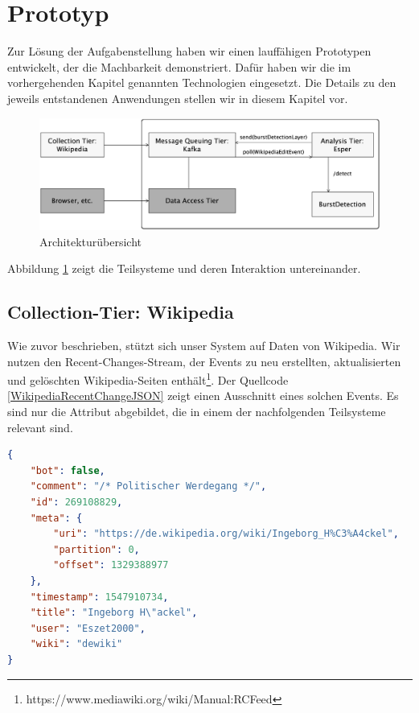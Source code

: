 \section{Prototyp}\label{section:prototyp}
Zur Lösung der Aufgabenstellung haben wir einen lauffähigen Prototypen entwickelt, der die Machbarkeit demonstriert.
Dafür haben wir die im vorhergehenden Kapitel genannten Technologien eingesetzt. Die Details zu den jeweils entstandenen
Anwendungen stellen wir in diesem Kapitel vor.

\begin{figure}
    \includegraphics[width=\textwidth]{images/Architektur_Uebersicht.png}
    \caption{Architekturübersicht}
    \label{fig:architektur_uebersicht}
\end{figure}

Abbildung \ref{fig:architektur_uebersicht} zeigt die Teilsysteme und deren Interaktion untereinander.


\subsection{Collection-Tier: Wikipedia}
Wie zuvor beschrieben, stützt sich unser System auf Daten von Wikipedia. Wir nutzen den Recent-Changes-Stream, der
Events zu neu erstellten, aktualisierten und gelöschten Wikipedia-Seiten enthält\footnote{https://www.mediawiki.org/wiki/Manual:RCFeed}.
Der Quellcode \ref{WikipediaRecentChangeJSON} zeigt einen Ausschnitt eines solchen Events.
Es sind nur die Attribut abgebildet, die in einem der nachfolgenden Teilsysteme relevant sind.

\begin{lstlisting}[label=WikipediaRecentChangeJSON,caption=Wikipedia RecentChange-Event,language=json,firstnumber=1,captionpos=b]
{
    "bot": false,
    "comment": "/* Politischer Werdegang */",
    "id": 269108829,
    "meta": {
        "uri": "https://de.wikipedia.org/wiki/Ingeborg_H%C3%A4ckel",
        "partition": 0,
        "offset": 1329388977
    },
    "timestamp": 1547910734,
    "title": "Ingeborg H\"ackel",
    "user": "Eszet2000",
    "wiki": "dewiki"
}
\end{lstlisting}

